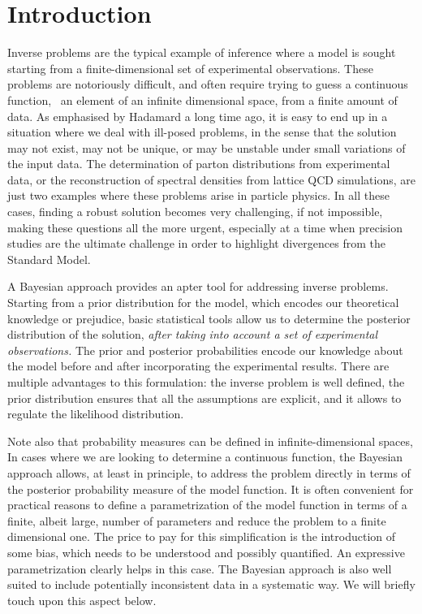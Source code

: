 \section{Introduction}
\label{sec:Intro}

Inverse problems are the typical example of inference where a model is sought
starting from a finite-dimensional set of experimental observations. These
problems are notoriously difficult, and often require trying to guess a
continuous function, \ie\ an element of an infinite dimensional space, from a
finite amount of data. As emphasised by Hadamard a long time ago, it is easy to
end up in a situation where we deal with ill-posed problems, in the sense that
the solution may not exist, may not be unique, or may be unstable under small
variations of the input data. The determination of parton distributions from
experimental data, or the reconstruction of spectral densities from lattice QCD
simulations, are just two examples where these problems arise in particle
physics. In all these cases, finding a robust solution becomes very challenging,
if not impossible, making these questions all the more urgent, especially at a
time when precision studies are the ultimate challenge in order to highlight
divergences from the Standard Model. 

A Bayesian approach provides an apter tool for addressing inverse problems.
Starting from a prior distribution for the model, which encodes our theoretical
knowledge or prejudice, basic statistical tools allow us to determine the
posterior distribution of the solution, {\it after taking into account a set of
experimental observations.} The prior and posterior probabilities encode our
knowledge about the model before and after incorporating the experimental
results. There are multiple advantages to this formulation: the inverse problem
is well defined, the prior distribution ensures that all the assumptions are
explicit, and it allows to regulate the likelihood distribution. 

Note also that probability measures can be defined in infinite-dimensional
spaces, In cases where we are looking to determine a continuous function, the
Bayesian approach allows, at least in principle, to address the problem directly
in terms of the posterior probability measure of the model function. It is often
convenient for practical reasons to define a parametrization of the model
function in terms of a finite, albeit large, number of parameters and reduce the
problem to a finite dimensional one. The price to pay for this simplification is
the introduction of some bias, which needs to be understood and possibly
quantified. An expressive parametrization clearly helps in this case. The
Bayesian approach is also well suited to include potentially inconsistent data
in a systematic way. We will briefly touch upon this aspect below. 


